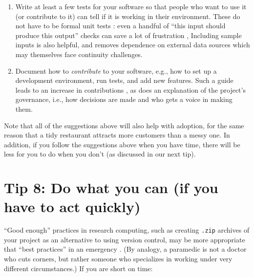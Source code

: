 \documentclass[10pt,letterpaper]{article}
\begin{document}
\begin{enumerate}
\item
  Write at least a few tests for your software
  so that people who want to use it (or contribute to it)
  can tell if it is working in their environment.
  These do not have to be formal unit tests \cite{Irving2021}:
  even a handful of ``this input should produce this output'' checks
  can save a lot of frustration \cite{Taschuk2017},
  Including sample inputs is also helpful,
  and removes dependence on external data sources which may themselves face continuity challenges.

\item
  Document how to \emph{contribute} to your software,
  e.g.,
  how to set up a development environment,
  run tests,
  and add new features.
  Such a guide leads to an increase in contributions \cite{Sholler2019},
  as does an explanation of the project's governance,
  i.e.,
  how decisions are made and who gets a voice in making them.

\end{enumerate}

Note that all of the suggestions above will also help with adoption,
for the same reason that a tidy restaurant attracts more customers than a messy one.
In addition,
if you follow the suggestions above when you have time,
there will be less for you to do when you don't
(as discussed in our next tip).

\section*{Tip 8: Do what you can (if you have to act quickly)}

``Good enough'' practices in research computing,
such as creating \texttt{.zip} archives of your project as an alternative to using version control,
may be more appropriate that ``best practices'' in an emergency \cite{Wilson2017}.
(By analogy,
a paramedic is not a doctor who cuts corners,
but rather someone who specializes in working under very different circumstances.)
If you are short on time:
\end{document}
